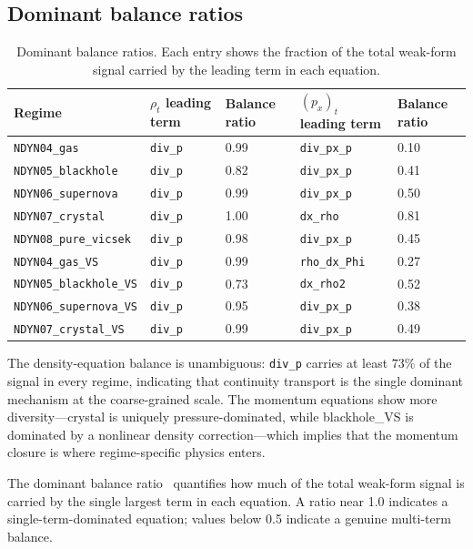 \subsection{Dominant balance ratios}

\begin{table}[ht]
\centering
\caption{Dominant balance ratios.  Each entry shows the fraction
of the total weak-form signal carried by the leading term in each equation.}
\label{tab:wsindy_dominant_balance}
\renewcommand{\arraystretch}{0.95}
\small
\begin{tabular}{lllll}
\toprule
\textbf{Regime} & $\rho_t$ leading term & Balance ratio & $(p_x)_t$ leading term & Balance ratio \\
\midrule
\texttt{NDYN04\_gas} & \texttt{div\_p} & 0.99 & \texttt{div\_px\_p} & 0.10 \\
\texttt{NDYN05\_blackhole} & \texttt{div\_p} & 0.82 & \texttt{div\_px\_p} & 0.41 \\
\texttt{NDYN06\_supernova} & \texttt{div\_p} & 0.99 & \texttt{div\_px\_p} & 0.50 \\
\texttt{NDYN07\_crystal} & \texttt{div\_p} & 1.00 & \texttt{dx\_rho} & 0.81 \\
\texttt{NDYN08\_pure\_vicsek} & \texttt{div\_p} & 0.98 & \texttt{div\_px\_p} & 0.45 \\
\midrule
\texttt{NDYN04\_gas\_VS} & \texttt{div\_p} & 0.99 & \texttt{rho\_dx\_Phi} & 0.27 \\
\texttt{NDYN05\_blackhole\_VS} & \texttt{div\_p} & 0.73 & \texttt{dx\_rho2} & 0.52 \\
\texttt{NDYN06\_supernova\_VS} & \texttt{div\_p} & 0.95 & \texttt{div\_px\_p} & 0.38 \\
\texttt{NDYN07\_crystal\_VS} & \texttt{div\_p} & 0.99 & \texttt{div\_px\_p} & 0.49 \\
\bottomrule
\end{tabular}
\end{table}

\noindent
The density-equation balance is unambiguous: \texttt{div\_p} carries at
least $73\%$ of the signal in every regime, indicating that continuity
transport is the single dominant mechanism at the coarse-grained scale.
The momentum equations show more diversity---crystal is uniquely
pressure-dominated, while blackhole\_VS is dominated by a nonlinear
density correction---which implies that the momentum closure is where
regime-specific physics enters.

The dominant balance ratio~\cite{callaham2021dominant} quantifies how much of
the total weak-form signal is carried by the single largest term in each
equation.  A ratio near 1.0 indicates a single-term-dominated equation; values
below 0.5 indicate a genuine multi-term balance.

